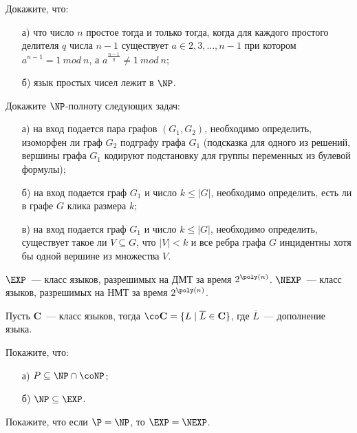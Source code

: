 
\begin{task}
    Докажите, что:
   	\begin{enumerate}[topsep = 0pt, itemsep = -1ex]
        \item [а)] что число $n$ простое тогда и только тогда, когда для каждого простого делителя $q$ числа $n - 1$ существует $a
            \in {2, 3, \dots, n - 1}$ при котором $a^{n - 1} = 1~mod~n$, а $a^{\frac{n - 1}{q}} \ne 1~mod~n$;
        \item [б)] язык простых чисел лежит в $\NP$.
	\end{enumerate}
\end{task}


\begin{task}
    Докажите $\NP$-полноту следующих задач:
    \begin{enumerate}[topsep = 0pt, itemsep = -1ex]
        \item [а)] на вход подается пара графов $(G_1, G_2)$, необходимо определить, изоморфен ли граф $G_2$ подграфу графа $G_1$
            (подсказка для одного из решений, вершины графа $G_1$ кодируют подстановку для группы переменных из булевой формулы);
        \item [б)] на вход подается граф $G_1$ и число $k \le |G|$, необходимо определить, есть ли в графе $G$ клика размера $k$;
        \item [в)] на вход подается граф $G_1$ и число $k \le |G|$, необходимо определить, существует такое ли $V \subseteq G$,
            что $|V| < k$ и все ребра графа $G$ инцидентны хотя бы одной вершине из множества $V$.
	\end{enumerate}
\end{task}


    

$\EXP$~--- класс языков, разрешимых на ДМТ за время $2^{\poly(n)}$. $\NEXP$~--- класс языков, разрешимых на НМТ за время
$2^{\poly(n)}$.

Пусть $\mathbf{C}$~--- класс языков, тогда ${\co}\mathbf{C} = \{L \mid \overline{L} \in \mathbf{C}\}$, где $\overline{L}$~---
дополнение языка.

\begin{task}
    Покажите, что:
    \begin{enumerate}[topsep = 0pt, itemsep = -1ex]
        \item [а)] $P \subseteq \NP \cap \coNP$;
        \item [б)] $\NP \subseteq \EXP$.
	\end{enumerate}
\end{task}

\begin{task}
   Покажите, что если $\P = \NP$, то $\EXP = \NEXP$. 
\end{task}
